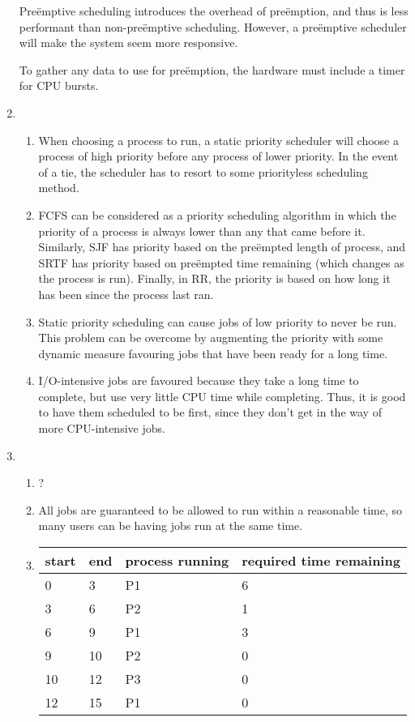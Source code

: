 \documentclass[11pt]{article}
\begin{document}
\begin{enumerate}
  Preëmptive scheduling introduces the overhead of preëmption, and thus is less performant than non-preëmptive scheduling. However, a preëmptive scheduler will make the system seem more responsive.

  To gather any data to use for preëmption, the hardware must include a timer for CPU bursts.
\item
  \begin{enumerate}
  \item When choosing a process to run, a static priority scheduler will choose a process of high priority before any process of lower priority. In the event of a tie, the scheduler has to resort to some priorityless scheduling method.
  \item FCFS can be considered as a priority scheduling algorithm in which the priority of a process is always lower than any that came before it. Similarly, SJF has priority based on the preëmpted length of process, and SRTF has priority based on preëmpted time remaining (which changes as the process is run). Finally, in RR, the priority is based on how long it has been since the process last ran.
  \item Static priority scheduling can cause jobs of low priority to never be run. This problem can be overcome by augmenting the priority with some dynamic measure favouring jobs that have been ready for a long time.
  \item I/O-intensive jobs are favoured because they take a long time to complete, but use very little CPU time while completing. Thus, it is good to have them scheduled to be first, since they don't get in the way of more CPU-intensive jobs.
  \end{enumerate}
\item
  \begin{enumerate}
  \item ?
  \item All jobs are guaranteed to be allowed to run within a reasonable time, so many users can be having jobs run at the same time.
  \item
    \begin{tabular}{ll|ll}
      start & end & process running & required time remaining \\
      \hline
       0 &  3 & P1 & 6 \\
       3 &  6 & P2 & 1 \\
       6 &  9 & P1 & 3 \\
       9 & 10 & P2 & 0 \\
      10 & 12 & P3 & 0 \\
      12 & 15 & P1 & 0 \\
    \end{tabular}


\end{enumerate}
\end{enumerate}
\end{document}
